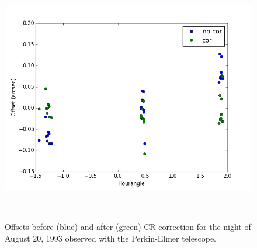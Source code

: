 \documentclass[12pt,a4paper]{report}
\begin{document}

\begin{figure}
\centering
\includegraphics[height=11.0cm]{Netuno_160_1993-08-20.png} 
\caption{Offsets before (blue) and after (green) CR correction for the night of August 20, 1993 observed with the Perkin-Elmer telescope.}
\label{Fig:refraction-sample-neptune}
\end{figure}
\end{document}
